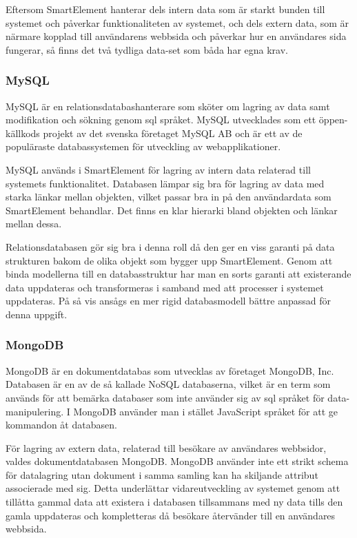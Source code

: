 Eftersom SmartElement hanterar dels intern data som är starkt bunden till systemet och påverkar funktionaliteten av systemet, och dels extern data, som är närmare kopplad till användarens webbsida och påverkar hur en användares sida fungerar, så finns det två tydliga data-set som båda har egna krav.

\subsubsection{MySQL}

MySQL är en relationsdatabashanterare som sköter om lagring av data samt modifikation och sökning genom \gls{sql} språket. MySQL utvecklades som ett öppen-källkods projekt av det svenska företaget MySQL AB och är ett av de populäraste databassystemen för utveckling av webapplikationer. \citep{dbengines}

MySQL används i SmartElement för lagring av intern data relaterad till systemets funktionalitet. Databasen lämpar sig bra för lagring av data med starka länkar mellan objekten, vilket passar bra in på den användardata som SmartElement behandlar. Det finns en klar hierarki bland objekten och länkar mellan dessa.

Relationsdatabasen gör sig bra i denna roll då den ger en viss garanti på data strukturen bakom de olika objekt som bygger upp SmartElement. Genom att binda modellerna till en databasstruktur har man en sorts garanti att existerande data uppdateras och transformeras i samband med att processer i systemet uppdateras. På så vis ansågs en mer rigid databasmodell bättre anpassad för denna uppgift.

\subsubsection{MongoDB}

MongoDB är en dokumentdatabas som utvecklas av företaget MongoDB, Inc. Databasen är en av de så kallade NoSQL databaserna, vilket är en term som används för att bemärka databaser som inte använder sig av \gls{sql} språket för data-manipulering. I MongoDB använder man i stället JavaScript språket för att ge kommandon åt databasen.

För lagring av extern data, relaterad till besökare av användares webbsidor, valdes dokumentdatabasen MongoDB. MongoDB använder inte ett strikt schema för datalagring utan dokument i samma samling kan ha skiljande attribut associerade med sig. Detta underlättar vidareutveckling av systemet genom att tillåtta gammal data att existera i databasen tillsammans med ny data tills den gamla uppdateras och kompletteras då besökare återvänder till en användares webbsida.

